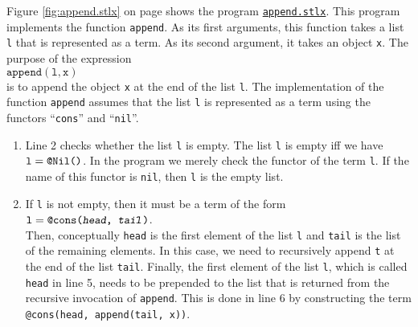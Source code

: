 Figure \ref{fig:append.stlx} on page \pageref{fig:append.stlx} shows the
program \href{https://github.com/karlstroetmann/Logik/blob/master/SetlX/append.stlx}{\texttt{append.stlx}}.
This program implements the function \texttt{append}.  As its first arguments, this function takes a list \texttt{l}
that is represented as a term.  As its second argument,  it takes an object \texttt{x}.  The purpose of the expression
\\[0.2cm]
\hspace*{1.3cm}
$\texttt{append}(\texttt{l}, \texttt{x})$
\\[0.2cm]
is to append the object \texttt{x} at the end of the list \texttt{l}.  The implementation of the function \texttt{append}
assumes that the list \texttt{l} is represented as a term using the functors ``\texttt{cons}'' and ``\texttt{nil}''.
\begin{enumerate}
\item Line 2 checks whether the list  \texttt{l} is empty. The list \texttt{l} is empty iff we have
      $\texttt{l} = \texttt{\at Nil()}$.  In the program we merely check the functor of the term \texttt{l}.  If the name of this functor is
      \texttt{nil}, then \texttt{l} is the empty list.
\item If \texttt{l} is not empty, then it must be a term of the form
      \\[0.2cm]
      \hspace*{1.3cm}
      $\texttt{l} = \texttt{\at cons(\textsl{head}, \textsl{tail})}$.
      \\[0.2cm]     
      Then, conceptually \texttt{head} is the first element of the list \texttt{l} and \texttt{tail} is the list of
      the remaining elements.  In this case, we need to recursively append \texttt{t} at the end of the list \texttt{tail}.
      Finally, the first element of the list \texttt{l}, which is called \texttt{head} in line 5, needs
      to be prepended to the list that is returned from the recursive invocation of \texttt{append}.
      This is done in line 6 by constructing the term 
      \\[0.2cm]
      \hspace*{1.3cm}
      \texttt{@cons(head, append(tail, x))}.
\end{enumerate}

